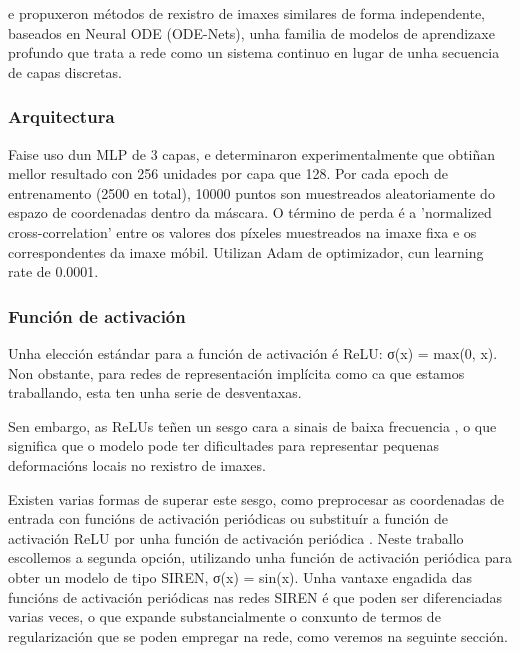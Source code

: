  \cite{sun2024medicalimageregistrationneural} e \cite{nodeo} propuxeron métodos de rexistro de imaxes similares de forma independente,
 baseados en Neural ODE (ODE-Nets)\cite{neuralode}, unha familia de modelos de aprendizaxe profundo que trata a rede como un sistema continuo en lugar de unha secuencia de capas discretas.


\subsubsection{Arquitectura}
\label{subsubsec:Arquitectura}

Faise uso dun MLP de 3 capas, e determinaron experimentalmente que obtiñan mellor resultado con 256 unidades por capa que 128.
Por cada epoch de entrenamento (2500 en total), 10000 puntos son muestreados aleatoriamente do espazo de coordenadas dentro da máscara.
O término de perda é a 'normalized cross-correlation' entre os valores dos píxeles muestreados na imaxe fixa e os correspondentes da imaxe móbil.
Utilizan Adam de optimizador, cun learning rate de 0.0001.

\subsubsection{Función de activación}
\label{subsubsec:Función de activación}

Unha elección estándar para a función de activación é ReLU: σ(x) = max(0, x). 
Non obstante, para redes de representación implícita como ca que estamos traballando, esta ten unha serie de desventaxas.

Sen embargo, as ReLUs teñen un sesgo cara a sinais de baixa frecuencia \cite{rahaman2019spectralbiasneuralnetworks}, 
 o que significa que o modelo pode ter dificultades para representar pequenas deformacións locais no rexistro de imaxes.
 
Existen varias formas de superar este sesgo, como preprocesar as coordenadas de entrada con funcións de activación periódicas \cite{mildenhall2020nerfrepresentingscenesneural} 
ou substituír a función de activación ReLU por unha función de activación periódica \cite{sitzmann2020implicitneuralrepresentationsperiodic}.
Neste traballo escollemos a segunda opción, utilizando unha función de activación periódica para obter un modelo de tipo SIREN, σ(x) = sin(x).
Unha vantaxe engadida das funcións de activación periódicas nas redes SIREN é que poden ser diferenciadas varias veces, 
o que expande substancialmente o conxunto de termos de regularización que se poden empregar na rede, como veremos na seguinte sección.

